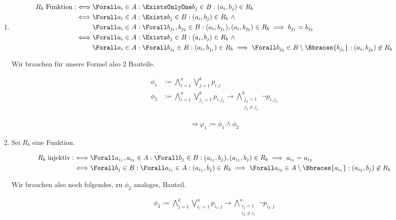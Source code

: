\begin{solution}
\begin{enumerate}[label = \arabic*.]
  \item

  \begin{align*}
    R_b ~\text{Funktion}
    :\iff
    & \Forall a_i \in A:
    \ExistsOnlyOne b_j \in B:
    (a_i, b_j) \in R_b \\
    \iff
    & \Forall a_i \in A:
    \Exists b_j \in B:
    (a_i, b_j) \in R_b
    ~ \land \\
    & \Forall a_i \in A:
    \Forall b_{j_1}, b_{j_2} \in B:
    (a_i, b_{j_1}), (a_i, b_{j_2}) \in R_b
    \implies
    b_{j_1} = b_{j_2} \\
    \iff
    & \Forall a_i \in A:
    \Exists b_j \in B:
    (a_i, b_j) \in R_b
    ~ \land \\
    & \Forall a_i \in A:
    \Forall b_{j_1} \in B:
    (a_i, b_{j_1}) \in R_b
    \implies
    \Forall b_{j_2} \in B \setminus \Bbraces{b_{j_1}}:
    (a_i, b_{j_2}) \not \in R_b
  \end{align*}

  Wir brauchen für unsere Formel also $2$ Bauteile.

  \begin{align*}
    \phi_1
    & :=
    \bigwedge_{i=1}^n \bigvee_{j=1}^kp_{i,j} \\
    \phi_2
    & :=
    \bigwedge_{i=1}^n \bigvee_{j_1=1}^kp_{i,j_1}
    \to
    \bigwedge_{\substack{j_2=1 \\ j_2\neq j_1}}^{k}\neg p_{i,j_2}
  \end{align*}

  \begin{align*}
    \rightsquigarrow
    \varphi_1 := \phi_1 \land \phi_2
  \end{align*}

  \item Sei $R_b$ eine Funktion.

  \begin{align*}
    R_b ~\text{injektiv}
    :\iff
    & \Forall a_{i_1}, a_{i_2} \in A:
    \Forall b_j \in B:
    (a_{i_1}, b_j), (a_{i_1}, b_j) \in R_b
    \implies
    a_{i_1} = a_{i_2} \\
    \iff
    & \Forall b_j \in B:
    \Forall a_{i_1} \in A:
    (a_{i_1}, b_j) \in R_b
    \implies
    \Forall a_{i_2} \in A \setminus \Bbraces{a_{i_1}}:
    (a_{i_2}, b_j) \not \in R_b
  \end{align*}

  Wir brauchen also noch folgendes, zu $\phi_2$ analoges, Bauteil.

  \begin{align*}
    \phi_3
    :=
    \bigwedge_{j=1}^k \bigvee_{i_1=1}^np_{i_1,j}
    \to
    \bigwedge_{\substack{i_2=1 \\ i_2\neq i_1}}^{n}\neg p_{i_2,j}
  \end{align*}


\end{enumerate}
\end{solution}
